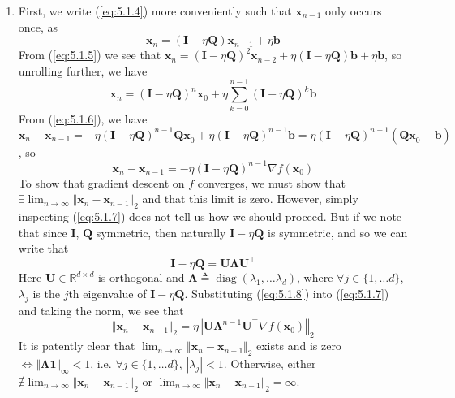 \documentclass{article}
\numberwithin{equation}{section}
\begin{document}
\begin{enumerate}[label=\alph*.]
    \item
    First, we write (\ref{eq:5.1.4}) more conveniently such that
    $ \mathbf{x}_{n - 1} $ only occurs once, as
    \begin{equation} \label{eq:5.1.5}
        \mathbf{x}_n =
        (\mathbf{I} - \eta\mathbf{Q})\mathbf{x}_{n - 1} + \eta\mathbf{b}
    \end{equation}
    From (\ref{eq:5.1.5}) we see that $ \mathbf{x}_n =
    (\mathbf{I} - \eta\mathbf{Q})^2\mathbf{x}_{n - 2} +
    \eta(\mathbf{I} - \eta\mathbf{Q})\mathbf{b} + \eta\mathbf{b} $, so
    unrolling further, we have
    \begin{equation} \label{eq:5.1.6}
        \mathbf{x}_n =
        (\mathbf{I} - \eta\mathbf{Q})^n\mathbf{x}_0 +
        \eta\sum_{k = 0}^{n - 1}(\mathbf{I} - \eta\mathbf{Q})^k\mathbf{b}
    \end{equation}
    From (\ref{eq:5.1.6}), we have $ \mathbf{x}_n - \mathbf{x}_{n - 1} =
    -\eta(\mathbf{I} - \eta\mathbf{Q})^{n - 1}\mathbf{Qx}_0 +
    \eta(\mathbf{I} - \eta\mathbf{Q})^{n - 1}\mathbf{b} =
    \eta(\mathbf{I} - \eta\mathbf{Q})^{n - 1}(\mathbf{Qx}_0 - \mathbf{b}) $,
    so
    \begin{equation} \label{eq:5.1.7}
        \mathbf{x}_n - \mathbf{x}_{n - 1} =
        -\eta(\mathbf{I} - \eta\mathbf{Q})^{n - 1}\nabla f(\mathbf{x}_0)
    \end{equation}
    To show that gradient descent on $ f $ converges, we must show that
    $ \exists\lim_{n \rightarrow \infty}\Vert\mathbf{x}_n -
    \mathbf{x}_{n - 1}\Vert_2 $ and that this limit is zero. However, simply
    inspecting (\ref{eq:5.1.7}) does not tell us how we should proceed. But
    if we note that since $ \mathbf{I} $, $ \mathbf{Q} $ symmetric, then
    naturally $ \mathbf{I} - \eta\mathbf{Q} $ is symmetric, and so we can
    write that
    \begin{equation} \label{eq:5.1.8}
        \mathbf{I} - \eta\mathbf{Q} = \mathbf{U\Lambda U}^\top
    \end{equation}
    Here $ \mathbf{U} \in \mathbb{R}^{d \times d} $ is orthogonal and
    $ \mathbf{\Lambda} \triangleq \operatorname{diag}(\lambda_1, \ldots
    \lambda_d) $, where $ \forall j \in \{1, \ldots d\} $, $ \lambda_j $ is
    the $ j $th eigenvalue of $ \mathbf{I} - \eta\mathbf{Q} $. Substituting
    (\ref{eq:5.1.8}) into (\ref{eq:5.1.7}) and taking the norm, we see that
    \begin{equation}
        \Vert\mathbf{x}_n - \mathbf{x}_{n - 1}\Vert_2 =
        \eta\left\Vert\mathbf{U\Lambda}^{n - 1}\mathbf{U}^\top
        \nabla f(\mathbf{x}_0)\right\Vert_2
    \end{equation}
    It is patently clear that $ \lim_{n \rightarrow \infty}
    \Vert\mathbf{x}_n - \mathbf{x}_{n - 1}\Vert_2 $ exists and is zero
    $ \Leftrightarrow \Vert\mathbf{\Lambda 1}\Vert_\infty < 1 $, i.e.
    $ \forall j \in \{1, \ldots d\} $, $ |\lambda_j| < 1 $. Otherwise, either
    $ \nexists\lim_{n \rightarrow \infty}
    \Vert\mathbf{x}_n - \mathbf{x}_{n - 1}\Vert_2 $ or
    $ \lim_{n \rightarrow \infty}
    \Vert\mathbf{x}_n - \mathbf{x}_{n - 1}\Vert_2 = \infty $.


\end{enumerate}
\end{document}
